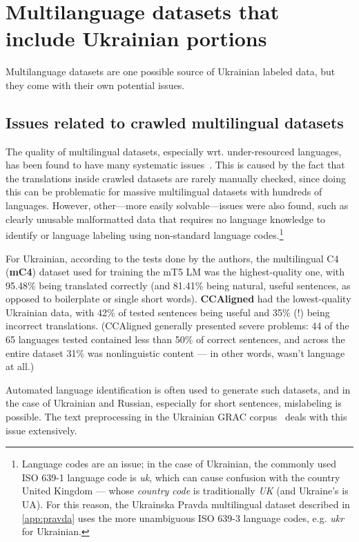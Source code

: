 \section{Multilanguage datasets that include Ukrainian portions}
\label{sec:multilingual}
Multilanguage datasets are one possible source of Ukrainian labeled data, but they come with their
own potential issues. 

\subsection{Issues related to crawled multilingual datasets}
The quality of multilingual datasets, especially wrt. under-resourced languages, has
been found to have many systematic issues~\cite{10.1162/tacl_a_00447}.
This is caused by the fact that the translations inside crawled datasets are rarely manually checked, 
since doing this can be problematic for massive multilingual datasets with hundreds of languages. 
However, other—more easily solvable—issues were also found, such as clearly unusable malformatted data that requires no language knowledge to identify or language labeling using non-standard language codes.\footnote{
Language codes are an issue; in the case of Ukrainian, the commonly used ISO 639-1 language code is \textit{uk}, which can cause confusion with the country United Kingdom — whose \textit{country code} is traditionally \textit{UK} (and Ukraine's is UA). 
For this reason, the Ukrainska Pravda multilingual dataset described in \autoref{app:pravda} uses the more unambiguous ISO 639-3 language codes, e.g. \textit{ukr} for Ukrainian.
}

For Ukrainian, according to the tests done by the authors, the multilingual C4 (\textbf{mC4}) dataset used for training the mT5 LM was the highest-quality one, with 95.48\% being translated correctly (and 81.41\% being natural, useful sentences, as opposed to boilerplate or single short words). 
\textbf{CCAligned} had the lowest-quality Ukrainian data, with 42\% of tested sentences being useful and 35\% (!) being incorrect translations. 
(CCAligned generally presented severe problems: 44 of the 65 languages tested contained less than 50\% of correct sentences,  and across the entire dataset 31\% was nonlinguistic content — in other words, wasn't language at all.)

Automated language identification is often used to generate such datasets, and in the case of Ukrainian and Russian, especially for short sentences, mislabeling is possible. 
The text preprocessing in the Ukrainian GRAC corpus~\cite{9648705} deals with this issue extensively.


